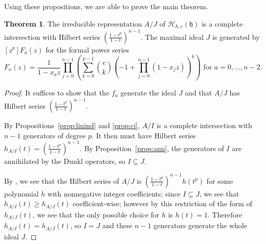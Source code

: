 \documentclass{amsart}
\numberwithin{equation}{section}
\theoremstyle{definition}
\newtheorem{theorem}[equation]{Theorem}
\newcommand{\h}{\mathfrak{h}}
\newcommand{\HH}{\mathcal{H}}
\begin{document}
Using these propositions, we are able to prove the main theorem.

\begin{theorem}\label{thm:main} The irreducible representation $A/J$  of $\HH_{\hbar,c}(\h)$ is a complete intersection with  Hilbert series $\left(\frac{1-t^p}{1-t}\right)^{n-1}$. The maximal ideal $J$ is generated by $[z^p]F_a(z)$ for the formal power series
\[
F_a(z)=\frac{1}{1-x_az} \prod_{j=0}^{n-1}\left( \sum_{k=0}^{p-1} \binom{c}{k}(-1+\prod_{j=0}^{n-1} (1-x_jz))^k\right) \text{ for $a=0,\dots,n-2$}.
\]
\end{theorem}
\begin{proof}
It suffices to show that the $f_a$ generate the ideal $J$ and that $A/J$ has Hilbert series $\left(\frac{1-t^p}{1-t}\right)^{n-1}$. 

By Propositions~\ref{prop:linind} and \ref{prop:ci}, $A/I$ is a complete intersection with $n-1$ generators of degree $p$. It then must have Hilbert series $h_{A/I}(t)=\left(\frac{1-t^p}{1-t}\right)^{n-1}$. By Proposition~\ref{prop:ann}, the generators of $I$ are annihilated by the Dunkl operators, so $I \subseteq J$.

By \cite[Proposition 3.4]{BC1}, we see that the Hilbert series of $A/J$ is $\left(\frac{1-t^p}{1-t}\right)^{n-1}h(t^p)$ for some polynomial $h$ with nonnegative integer coefficients; since $I \subseteq J$, we see that $h_{A/I}(t) \ge h_{A/J}(t)$ coefficient-wise; however by this restriction of the form of $h_{A/J}(t)$, we see that the only possible choice for $h$ is $h(t)=1$. Therefore $h_{A/I}(t)=h_{A/J}(t)$, so $I=J$ and these $n-1$ generators generate the whole ideal $J$.
\end{proof}



\end{document}
